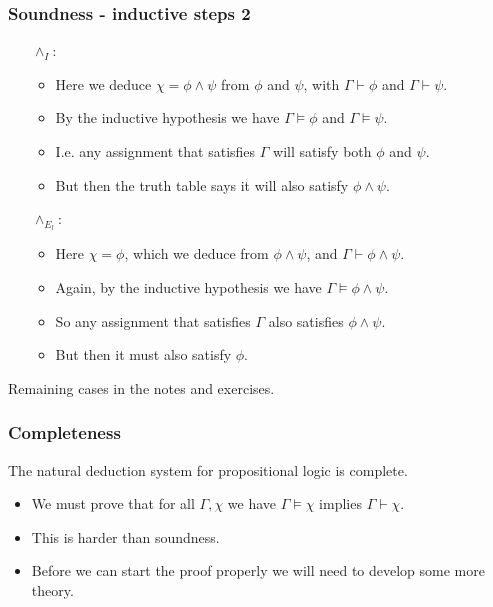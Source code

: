 \documentclass[handout]{beamer}
\begin{document}
\begin{frame}
\frametitle{Soundness - inductive steps 2}
\begin{itemize}
\item[$\wedge_I$:] \begin{itemize}
\item Here we deduce $\chi=\phi\wedge\psi$ from $\phi$ and $\psi$, with $\Gamma\vdash \phi$ and $\Gamma\vdash \psi$. 
\item By the inductive hypothesis we have $\Gamma\models \phi$ and $\Gamma\models \psi$. 
\item I.e. any assignment that satisfies $\Gamma$ will satisfy both $\phi$ and $\psi$. 
\item But then the truth table says it will also satisfy $\phi\wedge\psi$.
\end{itemize}
\vspace{1cm}
\item[$\wedge_{E_l}$:] 
\begin{itemize}
\item Here $\chi=\phi$, which we deduce from $\phi\wedge \psi$, and $\Gamma\vdash \phi\wedge\psi$. 
\item Again, by the inductive hypothesis we have $\Gamma\models \phi\wedge\psi$.
\item So any assignment that satisfies $\Gamma$ also satisfies $\phi\wedge \psi$. 
\item But then it must also satisfy $\phi$.
\end{itemize}
\end{itemize}
\vspace{1cm}
Remaining cases in the notes and exercises.
\end{frame}

\begin{frame}
\frametitle{Completeness}
\begin{theorem}\label{T:complete}
The natural deduction system for propositional logic is complete.
\end{theorem}
\vspace{.5cm}
\begin{itemize}
\item We must prove that for all $\Gamma,\chi$ we have $\Gamma \models \chi$ implies $\Gamma\vdash \chi$.
\vspace{.5cm}
\item This is harder than soundness.
\vspace{.5cm}
\item Before we can start the proof properly we will need to develop some more theory.
\end{itemize}
\end{frame}
\end{document}
